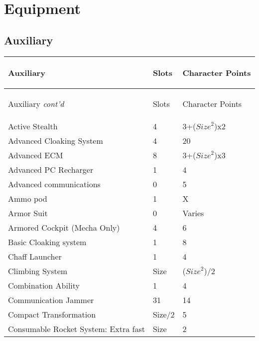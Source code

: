 \documentclass[twoside]{book}
\begin{document}
    

\section{Equipment}
    
    

\subsection{Auxiliary}
    
\begin{longtable}{p{1.25in}ll} 
  Auxiliary& \begin{turn}{70}{Slots}\end{turn}
          & \begin{turn}{70}{Character Points}\end{turn}
          \\
  \hline
  \hline
  \endfirsthead
  Auxiliary \textit{cont'd}
        & \begin{turn}{70}{Slots}\end{turn}
          & \begin{turn}{70}{Character Points}\end{turn}
           \\
  \hline
  \endhead
\raggedright  Active Stealth& 4& 3+(\begin{math}{Size}^{2}\end{math})x2\tabularnewline
      \raggedright  Advanced Cloaking System& 4& 20\tabularnewline
      \raggedright  Advanced ECM& 8& 3+(\begin{math}{Size}^{2}\end{math})x3\tabularnewline
      \raggedright  Advanced PC Recharger& 1& 4\tabularnewline
      \raggedright  Advanced communications& 0& 5\tabularnewline
      \raggedright  Ammo pod& 1& X\tabularnewline
      \raggedright  Armor Suit& 0& Varies\tabularnewline
      \raggedright  Armored Cockpit (Mecha Only)& 4& 6\tabularnewline
      \raggedright  Basic Cloaking system& 1& 8\tabularnewline
      \raggedright  Chaff Launcher& 1& 4\tabularnewline
      \raggedright  Climbing System& Size& (\begin{math}{Size}^{2}\end{math})/2\tabularnewline
      \raggedright  Combination Ability& 1& 4\tabularnewline
      \raggedright  Communication Jammer& 31& 14\tabularnewline
      \raggedright  Compact Transformation& Size/2& 5\tabularnewline
      \raggedright  Consumable Rocket System: Extra
           fast& Size& 2\tabularnewline

\end{longtable}
\end{document}
